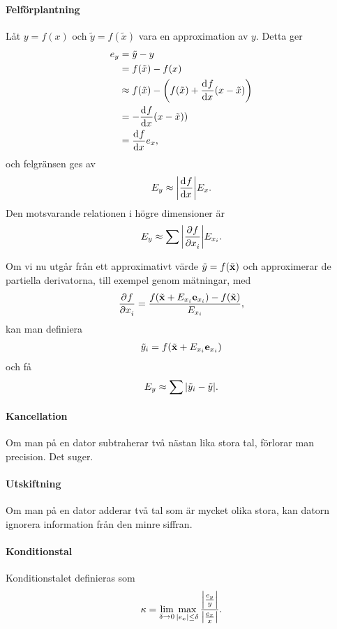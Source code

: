 \paragraph{Felförplantning}
Låt $y = f(x)$ och $\tilde{y} = f(\tilde{x})$ vara en approximation av $y$. Detta ger
\begin{align*}
	e_{y} &= \tilde{y} - y \\
	      &= f(\tilde{x}) - f(x) \\
	      &\approx f(\tilde{x}) - \left(f(\tilde{x}) + \dv[]{f}{x} (\tilde{x})(x - \tilde{x})\right) \\
	      &= -\dv[]{f}{x} (\tilde{x})(x - \tilde{x})) \\
	      &= \dv[]{f}{x} (\tilde{x})e_{x},
\end{align*}
och felgränsen ges av
\begin{align*}
	E_{y} \approx \abs{\dv[]{f}{x} (\tilde{x})}E_{x}.
\end{align*}
Den motsvarande relationen i högre dimensioner är
\begin{align*}
	E_{y} \approx \sum\abs{\pdv[]{f}{x_{i}} (\tilde{\vb{x}})}E_{x_{i}}.
\end{align*}

Om vi nu utgår från ett approximativt värde $\tilde{y} = f(\tilde{\vb{x}})$ och approximerar de partiella derivatorna, till exempel genom mätningar, med
\begin{align*}
	\pdv[]{f}{x_{i}} (\tilde{\vb{x}}) = \frac{f(\tilde{\vb{x}} + E_{x_{i}}\vb{e}_{x_{i}}) - f(\tilde{\vb{x}})}{E_{x_{i}}},
\end{align*}
kan man definiera
\begin{align*}
	\tilde{y}_{i} = f(\tilde{\vb{x}} + E_{x_{i}}\vb{e}_{x_{i}})
\end{align*}
och få
\begin{align*}
	E_{y} \approx \sum\abs{\tilde{y}_{i} - \tilde{y}}.
\end{align*}

\paragraph{Kancellation}
Om man på en dator subtraherar två nästan lika stora tal, förlorar man precision. Det suger.

\paragraph{Utskiftning}
Om man på en dator adderar två tal som är mycket olika stora, kan datorn ignorera information från den minre siffran.

\paragraph{Konditionstal}
Konditionstalet definieras som
\begin{align*}
	\kappa = \lim\limits_{\delta\to 0}\max\limits_{\abs{e_{x}} \leq \delta}\frac{\abs{\frac{e_{y}}{y}}}{\abs{\frac{e_{x}}{x}}}.
\end{align*}